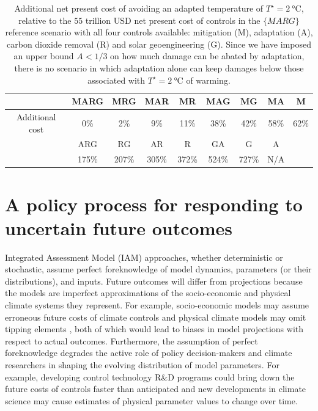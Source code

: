 \documentclass{article}
\begin{document}
\begin{table}[t]
\begin{center}
 \begin{tabular}{|| c || c | c | c | c | c | c | c | c ||}
 \hline
 & MARG & MRG & MAR & MR & MAG & MG & MA & M \\ [0.5ex] 
 \hline
 Additional cost &
 0\% &
 2\% &
 9\% &
 11\% &
 38\% &
 42\% &
 58\% &
 62\%
 \\
 \hline\hline\hline
 & ARG & RG & AR & R & GA & G & A & \\
 \hline
 &
 175\% &
 207\% &
 305\% &
 372\% &
 524\% &
 727\% &
 N/A &
 \\
 \hline
 \end{tabular}
\end{center}
\caption{Additional net present cost of avoiding an adapted temperature of $T^{\star}=\SI{2}{\celsius}$, relative to the $55$ trillion USD net present cost of controls in the $\{MARG\}$ reference scenario with all four controls available: mitigation (M), adaptation (A), carbon dioxide removal (R) and solar geoengineering (G). Since we have imposed an upper bound $A<1/3$ on how much damage can be abated by adaptation, there is no scenario in which adaptation alone can keep damages below those associated with $T^{\star} = \SI{2}{\celsius}$ of warming.}
\label{tab.relative_control_costs}
\end{table}

\section{A policy process for responding to uncertain future outcomes}\label{sec.reactive}

Integrated Assessment Model (IAM) approaches, whether deterministic or stochastic, assume perfect foreknowledge of model dynamics, parameters (or their distributions), and inputs. Future outcomes will differ from projections because the models are imperfect approximations of the socio-economic and physical climate systems they represent. For example, socio-economic models may assume erroneous future costs of climate controls and physical climate models may omit tipping elements \citep{steffen_trajectories_2018}, both of which would lead to biases in model projections with respect to actual outcomes. Furthermore, the assumption of perfect foreknowledge degrades the active role of policy decision-makers and climate researchers in shaping the evolving distribution of model parameters. For example, developing control technology R\&D programs could bring down the future costs of controls faster than anticipated and new developments in climate science may cause estimates of physical parameter values to change over time.
\end{document}
